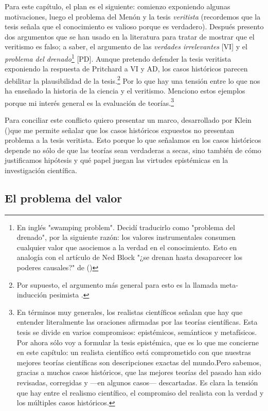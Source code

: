 Para este capítulo, el plan es el siguiente: comienzo exponiendo algunas motivaciones, luego el problema del Menón y la tesis \textit{veritista} (recordemos que la tesis señala que el conocimiento es valioso porque es verdadero).
Después presento dos argumentos que se han usado en la literatura para tratar de mostrar que el veritismo es falso; a saber, el argumento de las \emph{verdades irrelevantes} [VI] y el \emph{problema del drenado}\footnote{En inglés "swamping problem". Decidí traducirlo como "problema del drenado", por la siguiente razón: los valores instrumentales consumen cualquier valor que asociemos a la verdad en el conocimiento. Esto en analogía con el artículo de Ned Block "¿se drenan hasta desaparecer los poderes causales?" de (\citeyear{block2013})} [PD].
Aunque pretendo defender la tesis veritista exponiendo la respuesta de Pritchard a VI y AD, los casos históricos parecen debilitar la plausibilidad de la tesis.\footnote{Por supuesto, el argumento más general para esto es la llamada meta-inducción pesimista \parencite{laudan1981}.}
Por lo que hay una tensión entre lo que nos ha enseñado la historia de la ciencia y el veritismo.
Menciono estos ejemplos porque mi interés general es la evaluación de teorías.\footnote{En términos muy generales, los realistas científicos señalan que hay que entender literalmente las oraciones afirmadas por las teorías científicas. Esta tesis se divide en varios compromisos: epistémicos, semánticos y metafísicos. Por ahora sólo voy a formular la tesis epistémica, que es lo que me concierne en este capítulo: un realista científico está comprometido con que nuestras mejores teorías científicas son descripciones exactas del mundo.Pero sabemos, gracias a muchos casos históricos, que las mejores teorías del pasado han sido revisadas, corregidas y —en algunos casos— descartadas. Es clara la tensión que hay entre el realismo científico, el compromiso del realista con la verdad y los múltiples casos históricos.} 

Para conciliar este conflicto quiero presentar un marco, desarrollado por Klein (\citeyear{klein2019})que me permite señalar que los casos históricos expuestos no presentan problema a la tesis veritista.
Esto porque lo que señalamos en los casos históricos depende no sólo de que las teorías sean verdaderas a secas, sino también de cómo justificamos hipótesis y qué papel juegan las virtudes epistémicas en la investigación científica.

\subsection{El problema del valor}

